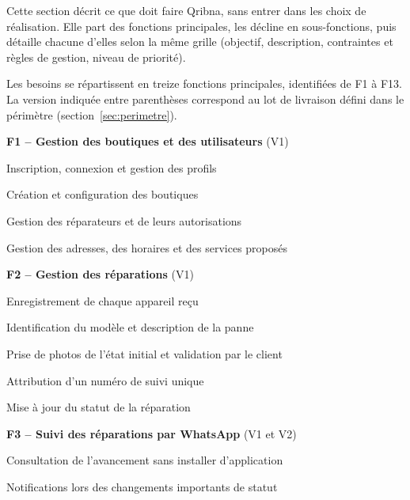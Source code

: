 

Cette section décrit ce que doit faire Qribna, sans entrer dans les choix de réalisation. Elle part des fonctions principales, les décline en sous-fonctions, puis détaille chacune d’elles selon la même grille (objectif, description, contraintes et règles de gestion, niveau de priorité).


Les besoins se répartissent en treize fonctions principales, identifiées de F1 à F13. La version indiquée entre parenthèses correspond au lot de livraison défini dans le périmètre (section~\ref{sec:perimetre}).

\begin{cdcitems}
  \item \textbf{F1 – Gestion des boutiques et des utilisateurs} (V1)
  \begin{cdcsousitems}
    \item Inscription, connexion et gestion des profils
    \item Création et configuration des boutiques
    \item Gestion des réparateurs et de leurs autorisations
    \item Gestion des adresses, des horaires et des services proposés
  \end{cdcsousitems}
  \item \textbf{F2 – Gestion des réparations} (V1)
  \begin{cdcsousitems}
    \item Enregistrement de chaque appareil reçu
    \item Identification du modèle et description de la panne
    \item Prise de photos de l’état initial et validation par le client
    \item Attribution d’un numéro de suivi unique
    \item Mise à jour du statut de la réparation
  \end{cdcsousitems}
  \item \textbf{F3 – Suivi des réparations par WhatsApp} (V1 et V2)
  \begin{cdcsousitems}
    \item Consultation de l’avancement sans installer d’application
    \item Notifications lors des changements importants de statut

\end{cdcsousitems}
\end{cdcitems}
